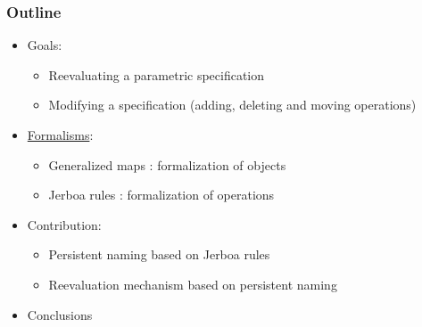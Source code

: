 \documentclass[]{beamer}
\begin{document}
\begin{frame}
	\frametitle{Outline}
	\begin{itemize}
		\item Goals:
		      \begin{itemize}
			      \item Reevaluating a parametric specification
			      \item Modifying a specification (adding, deleting and moving
			            operations)
		      \end{itemize}

		      \vspace{1em}

		\item \underline{Formalisms}:
		      \begin{itemize}
			      \item Generalized maps : formalization of objects
			      \item Jerboa rules : formalization of operations
		      \end{itemize}

		      \vspace{1em}

		\item Contribution:
		      \begin{itemize}
			      \item Persistent naming based on Jerboa rules
			      \item Reevaluation mechanism based on persistent naming
		      \end{itemize}
	  \item Conclusions
	\end{itemize}
\end{frame}
\end{document}
